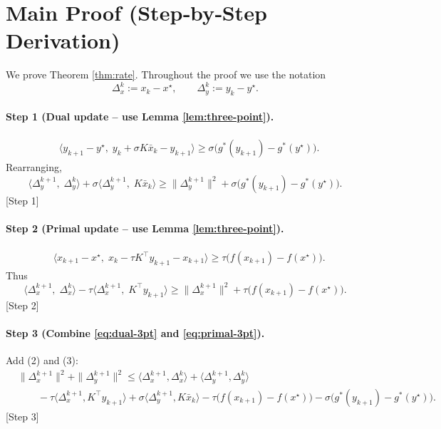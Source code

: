 \documentclass{article}
\begin{document}
\section*{Main Proof (Step‑by‑Step Derivation)}
We prove Theorem \ref{thm:rate}. Throughout the proof we use the notation
\[
\Delta_{x}^{k}:=x_{k}-x^{\star},\qquad 
\Delta_{y}^{k}:=y_{k}-y^{\star}.
\]

\paragraph{Step 1 (Dual update – use Lemma \ref{lem:three-point}).}
\begin{align}
&\langle y_{k+1}-y^{\star},\; y_{k}+ \sigma K\bar{x}_{k}-y_{k+1}\rangle
\ge \sigma\bigl(g^{*}(y_{k+1})-g^{*}(y^{\star})\bigr) .
\label{eq:dual-3pt}
\end{align}
Rearranging,
\[
\langle \Delta_{y}^{k+1},\; \Delta_{y}^{k}\rangle
+\sigma\langle \Delta_{y}^{k+1},\; K\bar{x}_{k}\rangle
\ge \|\Delta_{y}^{k+1}\|^{2}
+\sigma\bigl(g^{*}(y_{k+1})-g^{*}(y^{\star})\bigr).
\tag{2}
\]
[Step 1]

\paragraph{Step 2 (Primal update – use Lemma \ref{lem:three-point}).}
\begin{align}
&\langle x_{k+1}-x^{\star},\; x_{k}-\tau K^{\!\top}y_{k+1}-x_{k+1}\rangle
\ge \tau\bigl(f(x_{k+1})-f(x^{\star})\bigr).
\label{eq:primal-3pt}
\end{align}
Thus
\[
\langle \Delta_{x}^{k+1},\; \Delta_{x}^{k}\rangle
-\tau\langle \Delta_{x}^{k+1},\; K^{\!\top}y_{k+1}\rangle
\ge \|\Delta_{x}^{k+1}\|^{2}
+\tau\bigl(f(x_{k+1})-f(x^{\star})\bigr).
\tag{3}
\]
[Step 2]

\paragraph{Step 3 (Combine \eqref{eq:dual-3pt} and \eqref{eq:primal-3pt}).}
Add (2) and (3):
\[
\begin{aligned}
&\|\Delta_{x}^{k+1}\|^{2}+\|\Delta_{y}^{k+1}\|^{2}
\le
\langle \Delta_{x}^{k+1},\Delta_{x}^{k}\rangle
+\langle \Delta_{y}^{k+1},\Delta_{y}^{k}\rangle \\
&\qquad
-\tau\langle \Delta_{x}^{k+1}, K^{\!\top}y_{k+1}\rangle
+\sigma\langle \Delta_{y}^{k+1}, K\bar{x}_{k}\rangle
-\tau\bigl(f(x_{k+1})-f(x^{\star})\bigr)
-\sigma\bigl(g^{*}(y_{k+1})-g^{*}(y^{\star})\bigr).
\end{aligned}
\tag{4}
\]
[Step 3]
\end{document}
